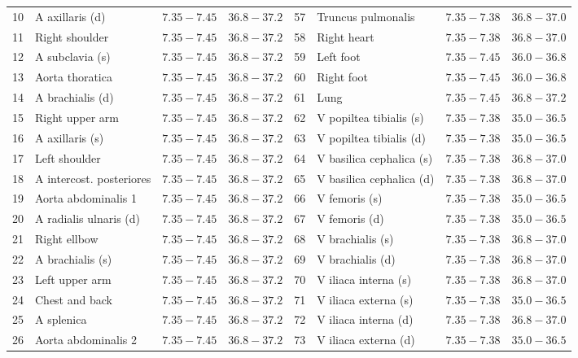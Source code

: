 \documentclass[sigconf]{acmart}
\begin{document}
\begin{table}[ht]
{\begin{tabular}{@{} clcc @{\hspace{3em}} clcc @{}}
    10 & A axillaris (d) & $7.35{-}7.45$ & $36.8{-}37.2$ & 57 & Truncus pulmonalis & $7.35{-}7.38$ & $36.8{-}37.0$ \\ 
    11 & Right shoulder & $7.35{-}7.45$ & $36.8{-}37.2$ & 58 & Right heart & $7.35{-}7.38$ & $36.8{-}37.0$ \\ 
    12 & A subclavia (s) & $7.35{-}7.45$ & $36.8{-}37.2$ & 59 & Left foot & $7.35{-}7.45$ & $36.0{-}36.8$ \\ 
    13 & Aorta thoratica & $7.35{-}7.45$ & $36.8{-}37.2$ & 60 & Right foot & $7.35{-}7.45$ & $36.0{-}36.8$ \\ 
    14 & A brachialis (d) & $7.35{-}7.45$ & $36.8{-}37.2$ & 61 & Lung & $7.35{-}7.45$ & $36.8{-}37.2$ \\ 
    15 & Right upper arm & $7.35{-}7.45$ & $36.8{-}37.2$ & 62 & V popiltea tibialis (s) & $7.35{-}7.38$ & $35.0{-}36.5$ \\ 
    16 & A axillaris (s) & $7.35{-}7.45$ & $36.8{-}37.2$ & 63 & V popiltea tibialis (d) & $7.35{-}7.38$ & $35.0{-}36.5$ \\ 
    17 & Left shoulder & $7.35{-}7.45$ & $36.8{-}37.2$ & 64 & V basilica cephalica (s) & $7.35{-}7.38$ & $36.8{-}37.0$ \\ 
    18 & A intercost. posteriores & $7.35{-}7.45$ & $36.8{-}37.2$ & 65 & V basilica cephalica (d) & $7.35{-}7.38$ & $36.8{-}37.0$ \\ 
    19 & Aorta abdominalis 1 & $7.35{-}7.45$ & $36.8{-}37.2$ & 66 & V femoris (s) & $7.35{-}7.38$ & $35.0{-}36.5$ \\ 
    20 & A radialis ulnaris (d) & $7.35{-}7.45$ & $36.8{-}37.2$ & 67 & V femoris (d) & $7.35{-}7.38$ & $35.0{-}36.5$ \\ 
    21 & Right ellbow & $7.35{-}7.45$ & $36.8{-}37.2$ & 68 & V brachialis (s) & $7.35{-}7.38$ & $36.8{-}37.0$ \\ 
    22 & A brachialis (s) & $7.35{-}7.45$ & $36.8{-}37.2$ & 69 & V brachialis (d) & $7.35{-}7.38$ & $36.8{-}37.0$ \\ 
    23 & Left upper arm & $7.35{-}7.45$ & $36.8{-}37.2$ & 70 & V iliaca interna (s) & $7.35{-}7.38$ & $36.8{-}37.0$ \\ 
    24 & Chest and back & $7.35{-}7.45$ & $36.8{-}37.2$ & 71 & V iliaca externa (s) & $7.35{-}7.38$ & $35.0{-}36.5$ \\ 
    25 & A splenica & $7.35{-}7.45$ & $36.8{-}37.2$ & 72 & V iliaca interna (d) & $7.35{-}7.38$ & $36.8{-}37.0$ \\ 
    26 & Aorta abdominalis 2 & $7.35{-}7.45$ & $36.8{-}37.2$ & 73 & V iliaca externa (d) & $7.35{-}7.38$ & $35.0{-}36.5$ \\ 

\end{tabular}}
\end{table}
\end{document}
